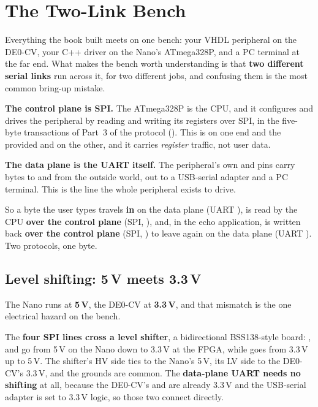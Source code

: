 
\section{The Two-Link Bench}
\label{c10:sec:bench}\label{c10:app:a}
Everything the book built meets on one bench: your VHDL peripheral on the DE0-CV, your C++ driver on
the Nano's ATmega328P, and a PC terminal at the far end. What makes the bench worth understanding is
that \textbf{two different serial links} run across it, for two different jobs, and confusing them is
the most common bring-up mistake.

\textbf{The control plane is SPI.} The ATmega328P is the CPU, and it configures and drives the
peripheral by reading and writing its registers over SPI, in the five-byte transactions of Part~3 of
the protocol (). This is  on one end and the provided
 and  on the other, and it carries \emph{register} traffic, not
user data.

\textbf{The data plane is the UART itself.} The peripheral's own  and  pins carry
bytes to and from the outside world, out to a USB-serial adapter and a PC terminal. This is the line
the whole peripheral exists to drive.

So a byte the user types travels \textbf{in} on the data plane (UART ), is read by the CPU
\textbf{over the control plane} (SPI, ), and, in the echo application, is written back
\textbf{over the control plane} (SPI, ) to leave again on the data plane (UART
). Two protocols, one byte.

\subsection{Level shifting: 5\,V meets 3.3\,V}
\label{c10:sec:level_shifting}
The Nano runs at \textbf{5\,V}, the DE0-CV at \textbf{3.3\,V}, and that mismatch is the one
electrical hazard on the bench.

The \textbf{four SPI lines cross a level shifter}, a bidirectional BSS138-style board: ,
 and  go from 5\,V on the Nano down to 3.3\,V at the FPGA, while  goes
from 3.3\,V up to 5\,V. The shifter's HV side ties to the Nano's 5\,V, its LV side to the DE0-CV's
3.3\,V, and the grounds are common. The \textbf{data-plane UART needs no shifting} at all, because
the DE0-CV's  and  are already 3.3\,V and the USB-serial adapter is set to 3.3\,V
logic, so those two connect directly.

